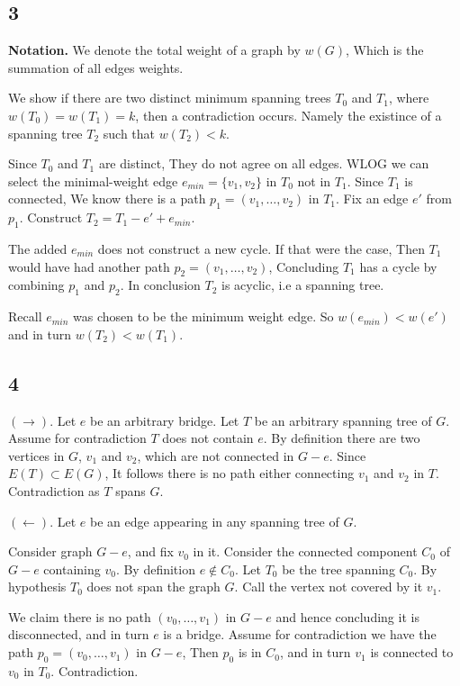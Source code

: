\documentclass[12pt]{extarticle}
\begin{document}


\subsection*{3}

\textbf{Notation.} We denote the total weight of a graph by $w(G)$, Which is the summation of all edges weights.

We show if there are two distinct minimum spanning trees $T_0$ and $T_1$, where $w(T_0) = w(T_1) = k$, then a contradiction occurs. Namely the existince of a spanning tree $T_2$ such that $w(T_2) < k$.

Since $T_0$ and $T_1$ are distinct, They do not agree on all edges. WLOG we can select the minimal-weight edge $e_{min} = \{ v_1, v_2 \}$ in $T_0$ not in $T_1$. Since $T_1$ is connected, We know there is a path $p_1 = (v_1, \dots, v_2)$ in $T_1$. Fix an edge $e'$ from $p_1$. Construct $T_2 = T_1 - e' + e_{min}$.

The added $e_{min}$ does not construct a new cycle. If that were the case, Then $T_1$ would have had another path $p_2 = (v_1, \dots, v_2)$, Concluding $T_1$ has a cycle by combining $p_1$ and $p_2$. In conclusion $T_2$ is acyclic, i.e a spanning tree.

Recall $e_{min}$ was chosen to be the minimum weight edge. So $w(e_{min}) < w(e')$ and in turn $w(T_2) < w(T_1)$.



\subsection*{4}

$(\rightarrow)$. Let $e$ be an arbitrary bridge. Let $T$ be an arbitrary spanning tree of $G$. Assume for contradiction $T$ does not contain $e$. By definition there are two vertices in $G$, $v_1$ and $v_2$, which are not connected in $G - e$. Since $E(T) \subset E(G)$, It follows there is no path either connecting $v_1$ and $v_2$ in $T$. Contradiction as $T$ spans $G$.

$(\leftarrow)$. Let $e$ be an edge appearing in any spanning tree of $G$.

Consider graph $G-e$, and fix $v_0$ in it. Consider the connected component $C_0$ of $G-e$ containing $v_0$. By definition $e \notin C_0$. Let $T_0$ be the tree spanning $C_0$. By hypothesis $T_0$ does not span the graph $G$. Call the vertex not covered by it $v_1$.

We claim there is no path $(v_0, \dots, v_1)$ in $G-e$ and hence concluding it is disconnected, and in turn $e$ is a bridge. Assume for contradiction we have the path $p_0 = (v_0, \dots, v_1)$ in $G-e$, Then $p_0$ is in $C_0$, and in turn $v_1$ is connected to $v_0$ in $T_0$. Contradiction.

\end{document}
